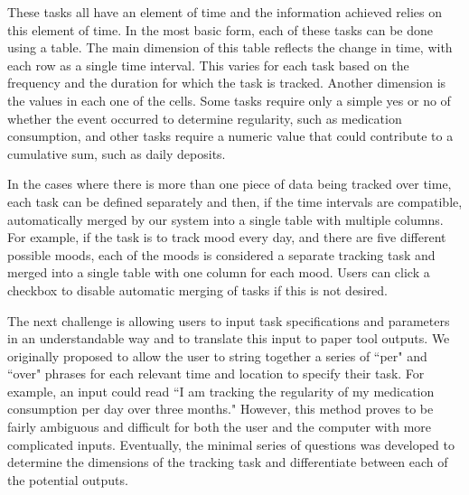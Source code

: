 \documentclass{sig-alternate}
\begin{document}
These tasks all have an element of time and the information achieved relies on this element of time. In the most basic form, each of these tasks can be done using a table. The main dimension of this table reflects the change in time, with each row as a single time interval. This varies for each task based on the frequency and the duration for which the task is tracked. Another dimension is the values in each one of the cells. Some tasks require only a simple yes or no of whether the event occurred to determine regularity, such as medication consumption, and other tasks require a numeric value that could contribute to a cumulative sum, such as daily deposits. 

In the cases where there is more than one piece of data being tracked over time, each task can be defined separately and then, if the time intervals are compatible, automatically merged by our system into a single table with multiple columns. For example, if the task is to track mood every day, and there are five different possible moods, each of the moods is considered a separate tracking task and merged into a single table with one column for each mood. Users can click a checkbox to disable automatic merging of tasks if this is not desired. 


The next challenge is allowing users to input task specifications and parameters in an understandable way and to translate this input to paper tool outputs. We originally proposed to allow the user to string together a series of ``per" and ``over" phrases for each relevant time and location to specify their task. For example, an input could read ``I am tracking the regularity of my medication consumption per day over three months." However, this method proves to be fairly ambiguous and difficult for both the user and the computer with more complicated inputs. Eventually, the minimal series of questions was developed to determine the dimensions of the tracking task and differentiate between each of the potential outputs. 
\end{document}

